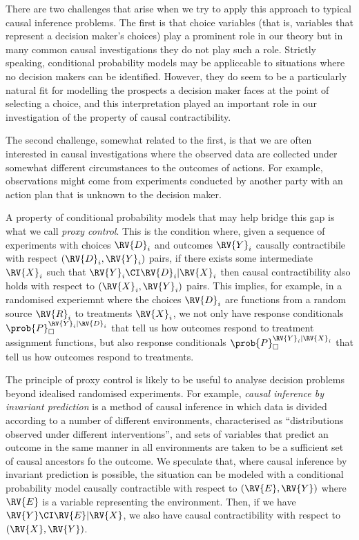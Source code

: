 There are two challenges that arise when we try to apply this approach to typical causal inference problems. The first is that choice variables (that is, variables that represent a decision maker's choices) play a prominent role in our theory but in many common causal investigations they do not play such a role. Strictly speaking, conditional probability models may be appliccable to situations where no decision makers can be identified. However, they do seem to be a particularly natural fit for modelling the prospects a decision maker faces at the point of selecting a choice, and this interpretation played an important role in our investigation of the property of causal contractibility.

The second challenge, somewhat related to the first, is that we are often interested in causal investigations where the observed data are collected under somewhat different circumstances to the outcomes of actions. For example, observations might come from experiments conducted by another party with an action plan that is unknown to the decision maker.

A property of conditional probability models that may help bridge this gap is what we call \emph{proxy control}. This is the condition where, given a sequence of experiments with choices $\RV{D}_i$ and outcomes $\RV{Y}_i$ causally contractibile with respect $(\RV{D}_i,\RV{Y}_i)$ pairs, if there exists some intermediate $\RV{X}_i$ such that $\RV{Y}_i\CI\RV{D}_i|\RV{X}_i$ then causal contractibility also holds with respect to $(\RV{X}_i,\RV{Y}_i)$ pairs. This implies, for example, in a randomised experiemnt where the choices $\RV{D}_i$ are functions from a random source $\RV{R}_i$ to treatments $\RV{X}_i$, we not only have response conditionals $\prob{P}_\square^{\RV{Y}_i|\RV{D}_i}$ that tell us how outcomes respond to treatment assignment functions, but also response conditionals $\prob{P}_\square^{\RV{Y}_i|\RV{X}_i}$ that tell us how outcomes respond to treatments.

The principle of proxy control is likely to be useful to analyse decision problems beyond idealised randomised experiments. For example, \emph{causal inference by invariant prediction} \citep{peters_causal_2016} is a method of causal inference in which data is divided according to a number of different environments, characterised as ``distributions observed under different interventions'', and sets of variables that predict an outcome in the same manner in all environments are taken to be a sufficient set of causal ancestors fo the outcome. We speculate that, where causal inference by invariant prediction is possible, the situation can be modeled with a conditional probability model causally contractible with respect to $(\RV{E},\RV{Y})$ where $\RV{E}$ is a variable representing the environment. Then, if we have $\RV{Y}\CI\RV{E}|\RV{X}$, we also have causal contractibility with respect to $(\RV{X},\RV{Y})$.

